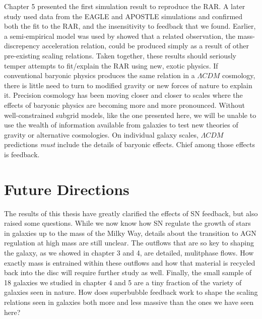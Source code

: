 Chapter 5 presented the first simulation result to reproduce the
\citet{McGaugh2016} RAR.  A later study \citep{Ludlow2016} used data from the
EAGLE \citep{Schaye2015} and APOSTLE \citep{Sawala2016} simulations and
confirmed both the fit to the RAR, and the insensitivity to feedback that we
found.  Earlier, a semi-empirical model was used by \citet{DiCintio2016} showed
that a related observation, the mass-discrepency acceleration relation, could
be produced simply as a result of other pre-existing scaling relations.  Taken
together, these results should seriously temper attempts to fit/explain the RAR
using new, exotic physics.  If conventional baryonic physics produces the same
relation in a $\Lambda CDM$ cosmology, there is little need to turn to modified
gravity \citep{Moffat2016,Verlinde2016} or new forces of nature
\citep{Burrage2016} to explain it.  Precision cosmology has been moving closer
and closer to scales where the effects of baryonic physics are becoming more and
more pronounced.  Without well-constrained subgrid models, like the one
presented here, we will be unable to use the wealth of information available
from galaxies to test new theories of gravity or alternative cosmologies.  On
individual galaxy scales, $\Lambda CDM$ predictions {\it must} include the
details of baryonic effects. Chief among those effects is feedback.

\section{Future Directions}
The results of this thesis have greatly clarified the effects of SN feedback,
but also raised some questions.  While we now know how SN regulate the
growth of stars in galaxies up to the mass of the Milky Way, details about the
transition to AGN regulation at high mass are still unclear.  The outflows that
are so key to shaping the galaxy, as we showed in chapter 3 and 4, are detailed,
mulitphase flows.  How exactly mass is entrained within these outflows and how
that material is recycled back into the disc will require further study as well.
Finally, the small sample of 18 galaxies we studied in chapter 4 and 5 are a
tiny fraction of the variety of galaxies seen in nature.  How does superbubble
feedback work to shape the scaling relations seen in galaxies both more and less
massive than the ones we have seen here?

